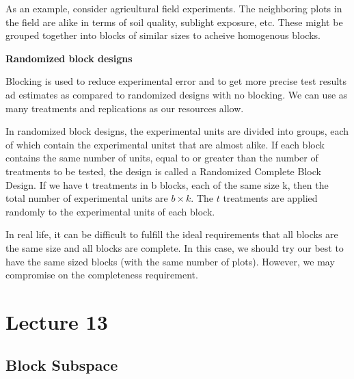 \documentclass{tufte-book}
\begin{document}
As an example, consider agricultural field experiments. The neighboring plots in the field are alike in terms of soil quality, 
sublight exposure, etc. These might be grouped together into blocks of similar sizes to acheive homogenous blocks. 

\textbf{Randomized block designs} 

Blocking is used to reduce experimental error and to get more precise test results ad estimates as compared to randomized 
designs with no blocking. We can use as many treatments and replications as our resources allow. 


In randomized block designs, the experimental units are divided into groups, each of which contain the experimental unitst
that are almost alike. If each block contains the same number of units, equal to or greater than the number of treatments
to be tested, the design is called a Randomized Complete Block Design. If we have t treatments in b blocks, each of the same
size k, then the total number of experimental units are $b \times k$. The $t$ treatments are applied randomly to the 
experimental units of each block.

In real life, it can be difficult to fulfill the ideal requirements that all blocks are the same size and all blocks are 
complete. In this case, we should try our best to have the same sized blocks (with the same number of plots). However, we may
compromise on the completeness requirement. 

\section{Lecture 13}

\subsection{Block Subspace}
\end{document}
